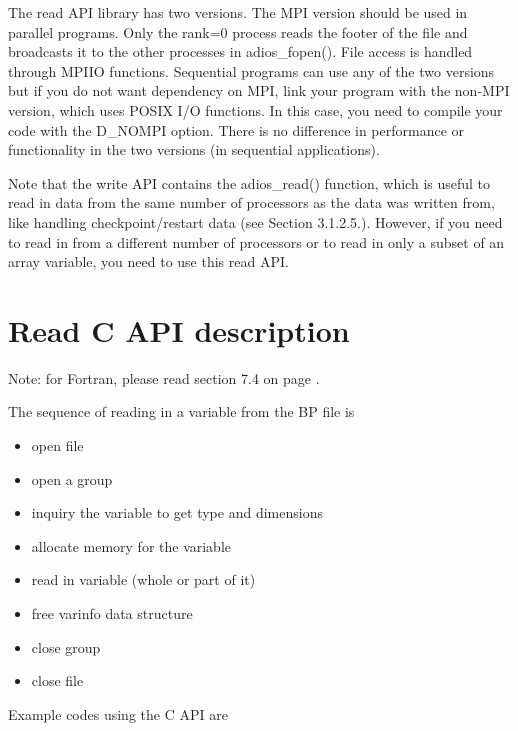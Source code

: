 \documentclass{report}
\begin{document}
The read API library has two versions. The MPI version should be used in parallel 
programs. Only the rank=0 process reads the footer of the file and broadcasts it 
to the other processes in adios\_fopen(). File access is handled through MPI\-{}IO 
functions. Sequential programs can use any of the two versions but if you do not 
want dependency on MPI, link your program with the non-MPI version, which uses 
POSIX I/O functions. In this case, you need to compile your code with the \-{}D\_NOMPI 
option. There is no difference in performance or functionality in the two versions 
(in sequential applications). 

Note that the write API contains the adios\_read() function, which is useful to 
read in data from the same number of processors as the data was written from, like 
handling checkpoint/restart data (see Section 3.1.2.5.). However, if you need to 
read in from a different number of processors or to read in only a subset of an 
array variable, you need to use this read API.\label{HToc182553398}

\section{Read C API description}

Note: for Fortran, please read section 7.4 on page \pageref{HRef144348801}.

The sequence of reading in a variable from the BP file is

\begin{itemize}
\renewcommand{\labelitemi}{$-$}
\item open file

\item open a group

\item inquiry the variable to get type and dimensions

\item allocate memory for the variable

\item read in variable (whole or part of it)

\item free varinfo data structure

\item close group

\item close file
\end{itemize}

Example codes using the C API are 
\end{document}
